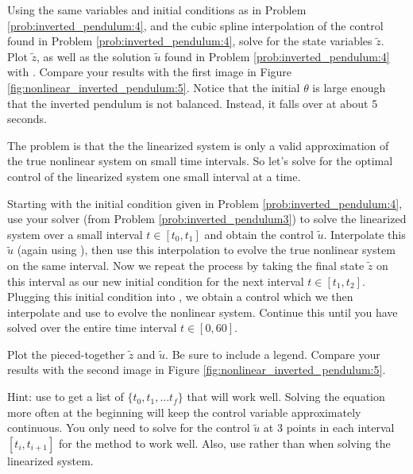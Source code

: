 \begin{problem}
Using the same variables and initial conditions as in Problem \ref{prob:inverted_pendulum:4}, and the cubic spline interpolation of the control found in Problem \ref{prob:inverted_pendulum:4}, solve for the state variables $\tilde{z}$. Plot $\tilde{z}$, as well as the solution $\tilde{u}$ found in Problem \ref{prob:inverted_pendulum:4} with . Compare your results with the first image in Figure \ref{fig:nonlinear_inverted_pendulum:5}.
Notice that the initial $\theta$ is large enough that the inverted pendulum is not balanced. Instead, it falls over at about 5 seconds.


The problem is that the the linearized system is only a valid approximation of the true nonlinear system on small time intervals.
So let's solve for the optimal control of the linearized system one small interval at a time.

Starting with the initial condition given in Problem \ref{prob:inverted_pendulum:4}, use your  solver (from Problem \ref{prob:inverted_pendulum3}) to solve the linearized system over a small interval $t\in[t_0,t_1]$ and obtain the control $\tilde u$.
Interpolate this $\tilde u$ (again using ), then use this interpolation to evolve the true nonlinear system on the same interval.
Now we repeat the process by taking the final state $\tilde z$ on this interval as our new initial condition for the next interval $t \in [t_1, t_2]$.
Plugging this initial condition into , we obtain a control which we then interpolate and use to evolve the nonlinear system.
Continue this until you have solved over the entire time interval $t\in[0,60]$.

Plot the pieced-together $\tilde{z}$ and $\tilde{u}$.
Be sure to include a legend.
Compare your results with the second image in Figure \ref{fig:nonlinear_inverted_pendulum:5}.

Hint: use  to get a list of $\{t_0, t_1, ... t_f\}$ that will work well. Solving the equation more often at the beginning will keep the control variable approximately continuous. You only need to solve for the control $\tilde u$ at 3 points in each interval $[t_i, t_{i+1}]$ for the method to work well.
Also, use  rather than  when solving the linearized system.

\label{prob:inverted_pendulum:5}
\end{problem}

